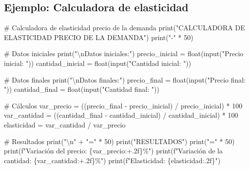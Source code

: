 \documentclass[
  doc,
  floatsintext,
  longtable,
  a4paper,
  nolmodern,
  notxfonts,
  notimes,
  12pt,
  colorlinks=true,linkcolor=blue,citecolor=blue,urlcolor=blue]{apa7}
\newenvironment{Shaded}{\begin{snugshade}}{\end{snugshade}}
\newcommand{\BuiltInTok}[1]{\textcolor[rgb]{0.00,0.23,0.31}{#1}}
\newcommand{\CharTok}[1]{\textcolor[rgb]{0.13,0.47,0.30}{#1}}
\newcommand{\CommentTok}[1]{\textcolor[rgb]{0.37,0.37,0.37}{#1}}
\newcommand{\DecValTok}[1]{\textcolor[rgb]{0.68,0.00,0.00}{#1}}
\newcommand{\NormalTok}[1]{\textcolor[rgb]{0.00,0.23,0.31}{#1}}
\newcommand{\OperatorTok}[1]{\textcolor[rgb]{0.37,0.37,0.37}{#1}}
\newcommand{\SpecialCharTok}[1]{\textcolor[rgb]{0.37,0.37,0.37}{#1}}
\newcommand{\SpecialStringTok}[1]{\textcolor[rgb]{0.13,0.47,0.30}{#1}}
\newcommand{\StringTok}[1]{\textcolor[rgb]{0.13,0.47,0.30}{#1}}
\begin{document}
\subsection{Ejemplo: Calculadora de
elasticidad}\label{ejemplo-calculadora-de-elasticidad}

\begin{Shaded}
\begin{Highlighting}[]
\CommentTok{\# Calculadora de elasticidad precio de la demanda}
\BuiltInTok{print}\NormalTok{(}\StringTok{"CALCULADORA DE ELASTICIDAD PRECIO DE LA DEMANDA"}\NormalTok{)}
\BuiltInTok{print}\NormalTok{(}\StringTok{"{-}"} \OperatorTok{*} \DecValTok{50}\NormalTok{)}

\CommentTok{\# Datos iniciales}
\BuiltInTok{print}\NormalTok{(}\StringTok{"}\CharTok{\textbackslash{}n}\StringTok{Datos iniciales:"}\NormalTok{)}
\NormalTok{precio\_inicial }\OperatorTok{=} \BuiltInTok{float}\NormalTok{(}\BuiltInTok{input}\NormalTok{(}\StringTok{"Precio inicial: "}\NormalTok{))}
\NormalTok{cantidad\_inicial }\OperatorTok{=} \BuiltInTok{float}\NormalTok{(}\BuiltInTok{input}\NormalTok{(}\StringTok{"Cantidad inicial: "}\NormalTok{))}

\CommentTok{\# Datos finales}
\BuiltInTok{print}\NormalTok{(}\StringTok{"}\CharTok{\textbackslash{}n}\StringTok{Datos finales:"}\NormalTok{)}
\NormalTok{precio\_final }\OperatorTok{=} \BuiltInTok{float}\NormalTok{(}\BuiltInTok{input}\NormalTok{(}\StringTok{"Precio final: "}\NormalTok{))}
\NormalTok{cantidad\_final }\OperatorTok{=} \BuiltInTok{float}\NormalTok{(}\BuiltInTok{input}\NormalTok{(}\StringTok{"Cantidad final: "}\NormalTok{))}

\CommentTok{\# Cálculos}
\NormalTok{var\_precio }\OperatorTok{=}\NormalTok{ ((precio\_final }\OperatorTok{{-}}\NormalTok{ precio\_inicial) }\OperatorTok{/}\NormalTok{ precio\_inicial) }\OperatorTok{*} \DecValTok{100}
\NormalTok{var\_cantidad }\OperatorTok{=}\NormalTok{ ((cantidad\_final }\OperatorTok{{-}}\NormalTok{ cantidad\_inicial) }\OperatorTok{/}\NormalTok{ cantidad\_inicial) }\OperatorTok{*} \DecValTok{100}
\NormalTok{elasticidad }\OperatorTok{=}\NormalTok{ var\_cantidad }\OperatorTok{/}\NormalTok{ var\_precio}

\CommentTok{\# Resultados}
\BuiltInTok{print}\NormalTok{(}\StringTok{"}\CharTok{\textbackslash{}n}\StringTok{"} \OperatorTok{+} \StringTok{"="} \OperatorTok{*} \DecValTok{50}\NormalTok{)}
\BuiltInTok{print}\NormalTok{(}\StringTok{"RESULTADOS"}\NormalTok{)}
\BuiltInTok{print}\NormalTok{(}\StringTok{"="} \OperatorTok{*} \DecValTok{50}\NormalTok{)}
\BuiltInTok{print}\NormalTok{(}\SpecialStringTok{f"Variación del precio:    }\SpecialCharTok{\{}\NormalTok{var\_precio}\SpecialCharTok{:+.2f\}}\SpecialStringTok{\%"}\NormalTok{)}
\BuiltInTok{print}\NormalTok{(}\SpecialStringTok{f"Variación de la cantidad: }\SpecialCharTok{\{}\NormalTok{var\_cantidad}\SpecialCharTok{:+.2f\}}\SpecialStringTok{\%"}\NormalTok{)}
\BuiltInTok{print}\NormalTok{(}\SpecialStringTok{f"Elasticidad:             }\SpecialCharTok{\{}\NormalTok{elasticidad}\SpecialCharTok{:.2f\}}\SpecialStringTok{"}\NormalTok{)}


\end{Highlighting}
\end{Shaded}
\end{document}
